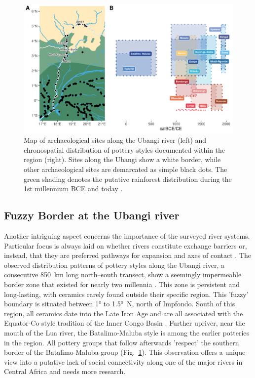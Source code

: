 \documentclass[smallextended,natbib]{svjour3}       %
\begin{document}
\begin{figure}[!tbp]
	\centering
	\includegraphics[width=\textwidth]{fig_ubangi_chrono.pdf}
	\caption{Map of archaeological sites along the Ubangi river (left) and chronospatial distribution of pottery styles documented within the region (right). Sites along the Ubangi show a white border, while other archaeological sites are demarcated as simple black dots. The green shading denotes the putative rainforest distribution during the 1st millennium BCE \citep[dark green;][]{Bremond.2017,Maley.2017} and today \citep[light green;][]{White.1983}.}
	\label{fig:ubangi.chrono}
\end{figure}

\subsection*{Fuzzy Border at the Ubangi river}

Another intriguing aspect concerns the importance of the surveyed river systems. Particular focus is always laid on whether rivers constitute exchange barriers or, instead, that they are preferred pathways for expansion and axes of contact \citep{Russell.2014}. The observed distribution patterns of pottery styles along the Ubangi river, a consecutive 850~km long north--south transect, show a seemingly impermeable border zone that existed for nearly two millennia \citep[Fig.~\ref{fig:ubangi.chrono};][183--185, 184 Tab.~17]{Seidensticker.2021e}. This zone is persistent and long-lasting, with ceramics rarely found outside their specific region. This 'fuzzy' boundary is situated between 1° to 1.5°~N, north of Impfondo. South of this region, all ceramics date into the Late Iron Age and are all associated with the Equator-Co style tradition of the Inner Congo Basin \citep{Wotzka.1995}. Further upriver, near the mouth of the Lua river, the Batalimo-Maluba style is among the earlier potteries in the region. All pottery groups that follow afterwards 'respect' the southern border of the Batalimo-Maluba group (Fig.~\ref{fig:ubangi.chrono}). This observation offers a unique view into a putative lack of social connectivity along one of the major rivers in Central Africa and needs more research.
\end{document}
